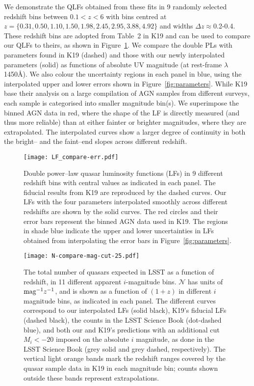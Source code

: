 \documentclass[fleqn,usenatbib]{mnras}
\begin{document}
We demonstrate the QLFs obtained from these fits in 9 randomly selected redshift bins between $0.1 < z < 6$ with bins centred at $z=\{0.31, 0.50, 1.10, 1.50, 1.98, 2.45, 2.95, 3.88, 4.92\}$ and widths $\Delta z\approx $0.2-0.4. These redshift bins are adopted from Table~2 in K19 and can be used to compare our QLFs to theirs, as shown in Figure~\ref{fig:LF-compare}. We compare the double PLs with parameters found in K19 (dashed) and those with our newly interpolated parameters (solid) as functions of absolute UV magnitude (at rest-frame  $\lambda$1450\AA). We also colour the uncertainty regions in each panel in blue, using the interpolated upper and lower errors shown in Figure~\ref{fig:parameters}.  While K19 base their analysis on a large compilation of AGN samples from different surveys, each sample is categorised into smaller magnitude bin(s). We superimpose the binned AGN data in red, where the shape of the LF is directly measured (and thus more reliable) than at either fainter or brighter magnitudes, where they are extrapolated. 
The interpolated curves show a larger degree of continuity in both the bright-- and the faint--end slopes across different redshift. 

\begin{figure}
  \centering
    \texttt{[image: LF\_compare-err.pdf]}
    \caption{Double power--law quasar luminosity functions (LFs) in 9 different redshift bins with central values as indicated in each panel. The fiducial results from K19 are reproduced by the dashed curves. Our LFs with the four parameters interpolated smoothly across different redshifts are shown by the solid curves. The red circles and their error bars represent the binned AGN data used in K19. The regions in shade blue indicate the upper and lower uncertainties in LFs obtained from interpolating the error bars in Figure~\ref{fig:parameters}.}
    \label{fig:LF-compare}
\end{figure}

\begin{figure*}
    \centering
    \texttt{[image: N-compare-mag-cut-25.pdf]}
    \caption{The total number of quasars expected in LSST as a function of redshift, in 11 different apparent $i$-magnitude bins. $\mathcal{N}$ has units of ${\rm mag}^{-1} z^{-1}$, 
    and is shown as a function of $(1+z)$ in different $i$ magnitude bins, as indicated in each panel. The different curves correspond to our interpolated LFs (solid black), K19's fiducial LFs (dashed black), the counts in the LSST Science Book (dot-dashed blue),
    and both our and K19's predictions with an additional cut $M_i<-20$ imposed on the absolute $i$ magnitude, as done in the LSST Science Book (grey solid and grey dashed, respectively). The vertical light orange bands mark the redshift ranges covered by the quasar sample data in K19 in each magnitude bin; counts shown outside these bands represent extrapolations.}
    \label{fig:N-z-coarse}
\end{figure*}
%
\end{document}
